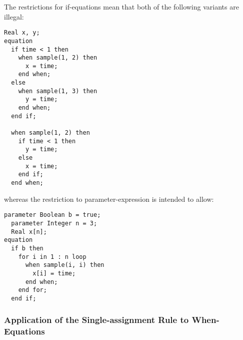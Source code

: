 \begin{example}
The restrictions for if-equations mean that both of the following variants are illegal:
\begin{lstlisting}[language=modelica]
  Real x, y;
equation
  if time < 1 then
    when sample(1, 2) then
      x = time;
    end when;
  else
    when sample(1, 3) then
      y = time;
    end when;
  end if;

  when sample(1, 2) then
    if time < 1 then
      y = time;
    else
      x = time;
    end if;
  end when;
\end{lstlisting}
whereas the restriction to parameter-expression is intended to allow:
\begin{lstlisting}[language=modelica]
  parameter Boolean b = true;
  parameter Integer n = 3;
  Real x[n];
equation
  if b then
    for i in 1 : n loop
      when sample(i, i) then
        x[i] = time;
      end when;
    end for;
  end if;
\end{lstlisting}
\end{example}

\subsubsection{Application of the Single-assignment Rule to When-Equations}\label{application-of-the-single-assignment-rule-to-when-equations}

